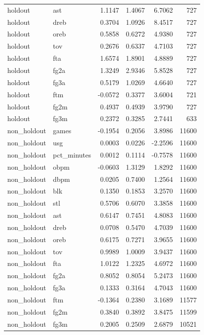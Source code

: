 \begin{table}
\begin{tabular}{llrrrr}
holdout & ast & 1.1147 & 1.4067 & 6.7062 & 727 \\
holdout & dreb & 0.3704 & 1.0926 & 8.4517 & 727 \\
holdout & oreb & 0.5858 & 0.6272 & 4.9380 & 727 \\
holdout & tov & 0.2676 & 0.6337 & 4.7103 & 727 \\
holdout & fta & 1.6574 & 1.8901 & 4.8889 & 727 \\
holdout & fg2a & 1.3249 & 2.9346 & 5.8528 & 727 \\
holdout & fg3a & 0.5179 & 1.0269 & 4.6640 & 727 \\
holdout & ftm & -0.0572 & 0.3377 & 3.6004 & 721 \\
holdout & fg2m & 0.4937 & 0.4939 & 3.9790 & 727 \\
holdout & fg3m & 0.2372 & 0.3285 & 2.7441 & 633 \\
non\_holdout & games & -0.1954 & 0.2056 & 3.8986 & 11600 \\
non\_holdout & usg & 0.0003 & 0.0226 & -2.2596 & 11600 \\
non\_holdout & pct\_minutes & 0.0012 & 0.1114 & -0.7578 & 11600 \\
non\_holdout & obpm & -0.0603 & 1.3129 & 1.8292 & 11600 \\
non\_holdout & dbpm & 0.0205 & 0.7400 & 1.2564 & 11600 \\
non\_holdout & blk & 0.1350 & 0.1853 & 3.2570 & 11600 \\
non\_holdout & stl & 0.5706 & 0.6070 & 3.3858 & 11600 \\
non\_holdout & ast & 0.6147 & 0.7451 & 4.8083 & 11600 \\
non\_holdout & dreb & 0.0708 & 0.5470 & 4.7039 & 11600 \\
non\_holdout & oreb & 0.6175 & 0.7271 & 3.9655 & 11600 \\
non\_holdout & tov & 0.9989 & 1.0009 & 3.9437 & 11600 \\
non\_holdout & fta & 1.0122 & 1.2325 & 4.6972 & 11600 \\
non\_holdout & fg2a & 0.8052 & 0.8054 & 5.2473 & 11600 \\
non\_holdout & fg3a & 0.1333 & 0.3164 & 4.7043 & 11600 \\
non\_holdout & ftm & -0.1364 & 0.2380 & 3.1689 & 11577 \\
non\_holdout & fg2m & 0.3840 & 0.3892 & 3.8475 & 11599 \\
non\_holdout & fg3m & 0.2005 & 0.2509 & 2.6879 & 10521 \\
\bottomrule
\end{tabular}
\end{table}
